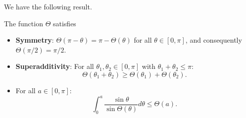 \documentclass[reqno,11pt]{amsart}
\begin{document}
    We have the following result.
    \begin{lemma}\label{lem:results_wilkinson_adapted}
        The function \(\Theta\) satisfies
        \begin{itemize}
            \item[(i)] \textbf{Symmetry}: \(\Theta(\pi - \theta) = \pi - \Theta(\theta)\) for all \(\theta \in [0,\pi]\), and consequently \(\Theta(\pi/2) = \pi/2\).
            \item[(ii)] \textbf{Superadditivity}: For all \(\theta_1, \theta_2 \in [0, \pi]\) with \(\theta_1 + \theta_2 \leq \pi\):
            \[
                \Theta(\theta_1 + \theta_2) \geq \Theta(\theta_1) + \Theta(\theta_2).
            \]
            \item[(iii)] For all \(a \in [0, \pi]\):
            \begin{equation}\label{equation_grand_theta}
                \int_0^a \frac{\sin \theta}{\sin \Theta(\theta)}  d\theta \leq \Theta(a).
            \end{equation}
        \end{itemize}
    \end{lemma}
\end{document}
